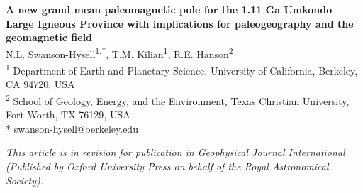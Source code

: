 \documentclass[11pt,letterpaper]{article}
\date{}
\begin{document}
\begin{flushleft}
{\Large \textbf{A new grand mean paleomagnetic pole for the 1.11 Ga Umkondo Large Igneous Province with implications for paleogeography and the geomagnetic field}}
\\
N.L. Swanson-Hysell\textsuperscript{1,*},
T.M. Kilian\textsuperscript{1},
R.E. Hanson\textsuperscript{2}
\\
\bigskip
\textsuperscript{1} Department of Earth and Planetary Science, University of California, Berkeley, CA 94720, USA
\\
\textsuperscript{2} School of Geology, Energy, and the Environment, Texas Christian University, Fort Worth, TX 76129, USA
\\
\bigskip
* swanson-hysell@berkeley.edu

\end{flushleft}

\noindent\textit{This article is in revision for publication in Geophysical Journal International (Published by Oxford University Press on behalf of the Royal Astronomical Society).}

\linenumbers
\end{document}
